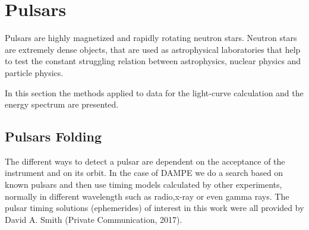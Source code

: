 \documentclass{PoS}
\begin{document}



\section{Pulsars}

Pulsars are highly magnetized and rapidly rotating neutron stars. Neutron stars are  extremely dense objects, that  are used as  astrophysical laboratories that help to test the constant struggling relation between astrophysics, nuclear physics  and particle physics. %

In this section the methods applied  to data for the light-curve calculation and the energy spectrum are presented.

 
 
\subsection{Pulsars Folding}
The different ways to detect a pulsar are dependent on the acceptance of the instrument and on its orbit. In the case of DAMPE we do a search based on known pulsars and  then use timing models calculated by other experiments, normally in different wavelength such as radio,x-ray or even gamma  rays. The pulsar timing solutions (ephemerides) of interest in this work were all provided by David A. Smith (Private Communication, 2017).

\end{document}
